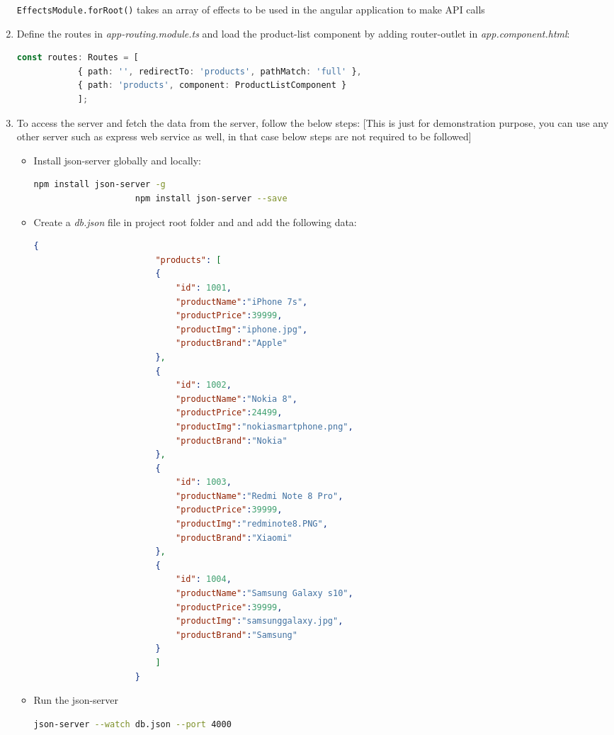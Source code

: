 \documentclass{report}
\begin{document}
\begin{enumerate}
\begin{lstlisting}[caption=app.module.ts, language=Typescript]
\end{lstlisting}
\lstinline{EffectsModule.forRoot()} takes an array of effects to be used in the angular application to make API calls
\item{ Define the routes in \textit{app-routing.module.ts} and load the product-list component by adding router-outlet in \textit{app.component.html}:}
		\begin{lstlisting}[caption=app-routing.module.ts, language=Typescript]
			const routes: Routes = [
			{ path: '', redirectTo: 'products', pathMatch: 'full' },
			{ path: 'products', component: ProductListComponent }
			];
\end{lstlisting}
\item{To access the server and fetch the data from the server, follow the below steps: [This is just for demonstration purpose, you can use any other server such as express web service as well, in that case below steps are not required to be followed]}
	\begin{itemize}
		\item{Install json-server globally and locally:}
				\begin{lstlisting}[language=bash]
					npm install json-server -g
					npm install json-server --save
		\end{lstlisting}
	\item{Create a \textit{db.json} file in project root folder and and add the following data:}
				\begin{lstlisting}[language=json, caption=db.json]
					{
						"products": [
						{
							"id": 1001,
							"productName":"iPhone 7s",
							"productPrice":39999,
							"productImg":"iphone.jpg",
							"productBrand":"Apple"
						},
						{
							"id": 1002,
							"productName":"Nokia 8",
							"productPrice":24499,
							"productImg":"nokiasmartphone.png",
							"productBrand":"Nokia"
						},
						{
							"id": 1003,
							"productName":"Redmi Note 8 Pro",
							"productPrice":39999,
							"productImg":"redminote8.PNG",
							"productBrand":"Xiaomi"
						},
						{
							"id": 1004,
							"productName":"Samsung Galaxy s10",
							"productPrice":39999,
							"productImg":"samsunggalaxy.jpg",
							"productBrand":"Samsung"
						}
						]
					}

	\end{lstlisting}
\item{Run the json-server}
				\begin{lstlisting}[language=bash]
					json-server --watch db.json --port 4000
\end{lstlisting}
\end{itemize}
\end{enumerate}
\end{document}
